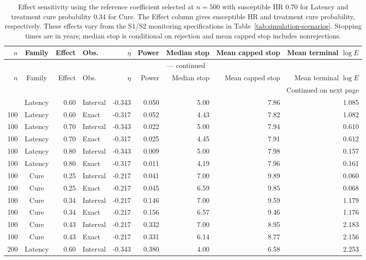 \documentclass[12pt]{article}
\theoremstyle{definition}
\theoremstyle{remark}
\begin{document}
\begin{longtable}{rcrlrrrrr}
\caption{Effect sensitivity using the reference coefficient selected at $n=500$ with susceptible HR 0.70 for Latency and treatment cure probability 0.34 for Cure. The Effect column gives susceptible HR and treatment cure probability, respectively. These effects vary from the S1/S2 monitoring specifications in Table~\ref{tab:simulation-scenarios}. Stopping times are in years; median stop is conditional on rejection and mean capped stop includes nonrejections.}\label{tab:effect-size}\\
\toprule
$n$ & Family & Effect & Obs. & $\eta$ & Power & Median stop & Mean capped stop & Mean terminal $\log E$ \\
\midrule
\endfirsthead
\multicolumn{9}{c}{\tablename\ \thetable{} --- continued}\\
\toprule
$n$ & Family & Effect & Obs. & $\eta$ & Power & Median stop & Mean capped stop & Mean terminal $\log E$ \\
\midrule
\endhead
\midrule
\multicolumn{9}{r}{Continued on next page}\\
\endfoot
\bottomrule
\endlastfoot
100 & Latency & 0.60 & Interval & -0.343 & 0.050 & 5.00 & 7.86 & 1.085 \\
100 & Latency & 0.60 & Exact & -0.317 & 0.052 & 4.43 & 7.82 & 1.082 \\
100 & Latency & 0.70 & Interval & -0.343 & 0.022 & 5.00 & 7.94 & 0.610 \\
100 & Latency & 0.70 & Exact & -0.317 & 0.025 & 4.45 & 7.91 & 0.612 \\
100 & Latency & 0.80 & Interval & -0.343 & 0.009 & 5.00 & 7.98 & 0.157 \\
100 & Latency & 0.80 & Exact & -0.317 & 0.011 & 4.19 & 7.96 & 0.161 \\
100 & Cure & 0.25 & Interval & -0.217 & 0.041 & 7.00 & 9.89 & 0.060 \\
100 & Cure & 0.25 & Exact & -0.217 & 0.045 & 6.59 & 9.85 & 0.068 \\
100 & Cure & 0.34 & Interval & -0.217 & 0.146 & 7.00 & 9.59 & 1.179 \\
100 & Cure & 0.34 & Exact & -0.217 & 0.156 & 6.57 & 9.46 & 1.176 \\
100 & Cure & 0.43 & Interval & -0.217 & 0.332 & 7.00 & 8.95 & 2.183 \\
100 & Cure & 0.43 & Exact & -0.217 & 0.331 & 6.14 & 8.77 & 2.156 \\
200 & Latency & 0.60 & Interval & -0.343 & 0.380 & 4.00 & 6.58 & 2.253 \\

\end{longtable}
\end{document}
